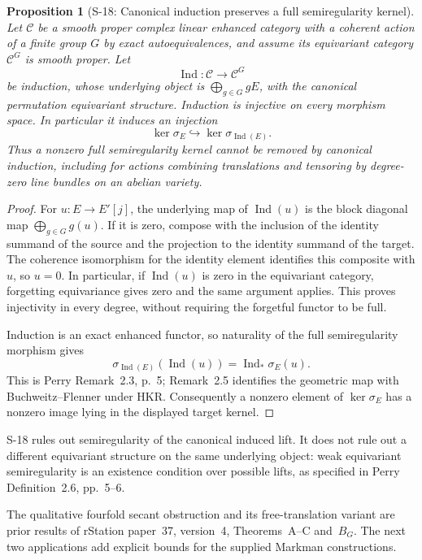 \documentclass[11pt,a4paper]{article}
\newtheorem{proposition}[theorem]{Proposition}
\theoremstyle{definition}
\begin{document}
\begin{proposition}[S-18: Canonical induction preserves a full semiregularity kernel]
\label{prop:semireg-induction-kernel}
Let $\mathcal C$ be a smooth proper complex linear enhanced
category with a coherent action of a finite group $G$ by exact
autoequivalences, and assume its equivariant category
$\mathcal C^G$ is smooth proper. Let
\[
 \operatorname{Ind}:\mathcal C\longrightarrow\mathcal C^G
\]
be induction, whose underlying object is
$\bigoplus_{g\in G}gE$, with the canonical permutation
equivariant structure. Induction is injective on every morphism
space. In particular it induces an injection
\[
 \ker\sigma_E\hookrightarrow
       \ker\sigma_{\operatorname{Ind}(E)}.
\]
Thus a nonzero full semiregularity kernel cannot be removed by
canonical induction, including for actions combining
translations and tensoring by degree-zero line bundles on an
abelian variety.
\end{proposition}
\begin{proof}
For $u:E\to E'[j]$, the underlying map of
$\operatorname{Ind}(u)$ is the block diagonal map
$\bigoplus_{g\in G}g(u)$.
If it is zero, compose with the inclusion of the identity
summand of the source and the projection to the identity
summand of the target. The coherence isomorphism for the
identity element identifies this composite with $u$, so $u=0$.
In particular, if $\operatorname{Ind}(u)$ is zero in the
equivariant category, forgetting equivariance gives zero and
the same argument applies. This proves injectivity in every
degree, without requiring the forgetful functor to be full.

Induction is an exact enhanced functor, so naturality of the
full semiregularity morphism gives
\[
 \sigma_{\operatorname{Ind}(E)}(\operatorname{Ind}(u))
       =\operatorname{Ind}_*\sigma_E(u).
\]
This is Perry Remark~2.3, p.~5; Remark~2.5 identifies the
geometric map with Buchweitz--Flenner under HKR.
Consequently a nonzero element of $\ker\sigma_E$ has a
nonzero image lying in the displayed target kernel.
\end{proof}

S-18 rules out semiregularity of the canonical induced lift.
It does not rule out a different equivariant structure on the
same underlying object: weak equivariant semiregularity is
an existence condition over possible lifts, as specified in
Perry Definition~2.6, pp.~5--6.

The qualitative fourfold secant obstruction and its free-translation
variant are prior results of rStation paper~37, version~4,
Theorems~A--C and~$B_G$. The next two applications add
explicit bounds for the supplied Markman constructions.
\end{document}
